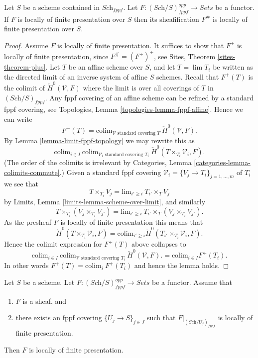 \begin{lemma}
\label{lemma-sheafify-finite-presentation}
Let $S$ be a scheme contained in $\textit{Sch}_{fppf}$.
Let $F : (\textit{Sch}/S)_{fppf}^{opp} \to \textit{Sets}$ be a functor.
If $F$ is locally of finite presentation over $S$ then its sheafification
$F^\#$ is locally of finite presentation over $S$.
\end{lemma}

\begin{proof}
Assume $F$ is locally of finite presentation.
It suffices to show that $F^+$ is locally of finite presentation, since
$F^\# = (F^+)^+$, see
Sites, Theorem \ref{sites-theorem-plus}.
Let $T$ be an affine scheme over $S$, and let $T = \lim T_i$ be written
as the directed limit of an inverse system of affine $S$ schemes.
Recall that $F^+(T)$ is the colimit of $\check H^0(\mathcal{V}, F)$
where the limit is over all coverings of $T$ in $(\textit{Sch}/S)_{fppf}$.
Any fppf covering of an affine scheme can be refined by a standard
fppf covering, see
Topologies, Lemma \ref{topologies-lemma-fppf-affine}.
Hence we can write
$$
F^+(T)
=
\text{colim}_{\mathcal{V}\text{ standard covering }T}\ 
\check H^0(\mathcal{V}, F).
$$
By
Lemma \ref{lemma-limit-fppf-topology}
we may rewrite this as
$$
\text{colim}_{i \in I}\ 
\text{colim}_{\mathcal{V}_i\text{ standard covering }T_i}\ 
\check H^0(T \times_{T_i}\mathcal{V}_i, F).
$$
(The order of the colimits is irrelevant by
Categories, Lemma \ref{categories-lemma-colimits-commute}.)
Given a standard fppf covering
$\mathcal{V}_i = \{V_j \to T_i\}_{j = 1, \ldots, m}$ of $T_i$ we see that
$$
T \times_{T_i} V_j = \text{lim}_{i' \geq i}\ T_{i'} \times_T V_j
$$
by 
Limits, Lemma \ref{limits-lemma-scheme-over-limit}, and similarly
$$
T \times_{T_i} (V_j \times_{T_i} V_{j'}) =
\text{lim}_{i' \geq i}\ T_{i'} \times_T (V_j \times_{T_i} V_{j'}).
$$
As the presheaf $F$ is locally of finite presentation this means that
$$
\check H^0(T \times_{T_i}\mathcal{V}_i, F)
=
\text{colim}_{i' \geq i}
\check H^0(T_{i'} \times_{T_i}\mathcal{V}_i, F).
$$
Hence the colimit expression for $F^+(T)$ above collapses to
$$
\text{colim}_{i \in I}\ 
\text{colim}_{\mathcal{V}\text{ standard covering }T_i}\ 
\check H^0(\mathcal{V}, F).
=
\text{colim}_{i \in I} F^+(T_i).
$$
In other words $F^+(T) = \text{colim}_i\ F^+(T_i)$ and hence
the lemma holds.
\end{proof}

\begin{lemma}
\label{lemma-sheaf-finite-presentation}
Let $S$ be a scheme. 
Let $F : (\textit{Sch}/S)_{fppf}^{opp} \to \textit{Sets}$ be a functor.
Assume that
\begin{enumerate}
\item $F$ is a sheaf, and
\item there exists an fppf covering $\{U_j \to S\}_{j \in J}$ such that
$F|_{(\textit{Sch}/U_j)_{fppf}}$ is locally of finite presentation.
\end{enumerate}
Then $F$ is locally of finite presentation.
\end{lemma}

